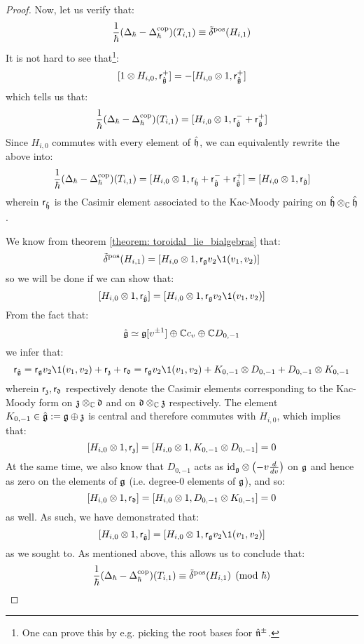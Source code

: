 \begin{proof}
                Now, let us verify that:
                    $$\frac{1}{\hbar}(\Delta_{\hbar} - \Delta_{\hbar}^{\mathrm{cop}})(T_{i, 1}) \equiv \tilde{\delta}^{\mathrm{pos}}(H_{i, 1})$$
                It is not hard to see that\footnote{One can prove this by e.g. picking the root bases foor $\hat{\mathfrak{n}}^{\pm}$.}:
                    $$[1 \tensor H_{i, 0}, \sfr_{ \hat{\g} }^+] = -[H_{i, 0} \tensor 1, \sfr_{ \hat{\g} }^+]$$
                which tells us that:
                    $$\frac{1}{\hbar}( \Delta_{\hbar} - \Delta_{\hbar}^{\cop} )(T_{i, 1}) = [H_{i, 0} \tensor 1, \sfr_{ \hat{\g} }^- + \sfr_{ \hat{\g} }^+]$$
                Since $H_{i, 0}$ commutes with every element of $\hat{\mathfrak{h}}$, we can equivalently rewrite the above into:
                    $$\frac{1}{\hbar}( \Delta_{\hbar} - \Delta_{\hbar}^{\cop} )(T_{i, 1}) = [H_{i, 0} \tensor 1, \sfr_{\hat{\h}} + \sfr_{ \hat{\g} }^- + \sfr_{ \hat{\g} }^+] = [H_{i, 0} \tensor 1, \sfr_{ \hat{\g} }]$$
                wherein $\mathsf{r}_{\hat{\mathfrak{h}}}$ is the Casimir element associated to the Kac-Moody pairing on $\hat{\h} \tensor_{\bbC} \hat{\h}$. 

                We know from theorem \ref{theorem: toroidal_lie_bialgebras} that:
                    $$\tilde{\delta}^{\positive}(H_{i, 1}) = [ H_{i, 0} \tensor 1, \sfr_{\g} v_2 \1(v_1, v_2) ]$$
                so we will be done if we can show that:
                    $$[H_{i, 0} \tensor 1, \sfr_{ \hat{\g} }] = [ H_{i, 0} \tensor 1, \sfr_{\g} v_2 \1(v_1, v_2) ]$$
                From the fact that:
                    $$\hat{\mathfrak{g}} \simeq \mathfrak{g}[v^{\pm 1}] \oplus \mathbb{C} c_v \oplus \mathbb{C} D_{0, -1}$$
                we infer that:
                    $$\sfr_{ \hat{\g} } = \sfr_{\g} v_2 \1(v_1, v_2) + \sfr_{\z} + \sfr_{\d} = \sfr_{\g} v_2 \1(v_1, v_2) + K_{0, -1} \tensor D_{0, -1} + D_{0, -1} \tensor K_{0, -1}$$
                wherein $\mathsf{r}_{\mathfrak{z}}, \mathsf{r}_{\mathfrak{d}}$ respectively denote the Casimir elements corresponding to the Kac-Moody form on $\z \tensor_{\bbC} \d$ and on $\d \tensor_{\bbC} \z$ respectively. The element $K_{0, -1} \in \hat{\mathfrak{g}} := \mathfrak{g} \oplus \mathfrak{z}$ is central and therefore commutes with $H_{i, 0}$, which implies that:
                    $$[H_{i, 0} \tensor 1, \sfr_{\z}] = [H_{i, 0} \tensor 1, K_{0, -1} \tensor D_{0, -1}] = 0$$
                At the same time, we also know that $D_{0, -1}$ acts as $\id_{\g} \tensor \left(-v \frac{d}{dv}\right)$ on $\mathfrak{g}$ and hence as zero on the elements of $\mathfrak{g}$ (i.e. degree-$0$ elements of $\mathfrak{g}$), and so:
                    $$[H_{i, 0} \tensor 1, \sfr_{\d}] = [H_{i, 0} \tensor 1, D_{0, -1} \tensor K_{0, -1}] = 0$$
                as well. As such, we have demonstrated that:
                    $$[H_{i, 0} \tensor 1, \sfr_{ \hat{\g} }] = [ H_{i, 0} \tensor 1, \sfr_{\g} v_2 \1(v_1, v_2) ]$$
                as we sought to. As mentioned above, this allows us to conclude that:
                    $$\frac{1}{\hbar}( \Delta_{\hbar} - \Delta_{\hbar}^{\mathrm{cop}} )(T_{i, 1}) \equiv \tilde{\delta}^{\mathrm{pos}}(H_{i, 1}) \pmod{\hbar}$$
            \end{proof}

